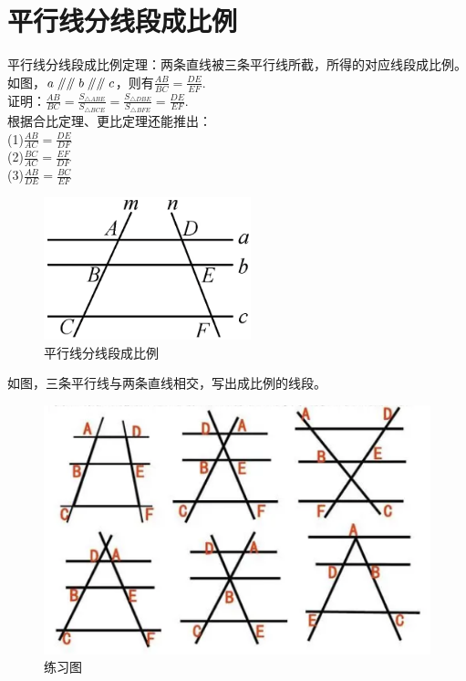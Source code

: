 \documentclass{ecnuthesis}
\newcommand\px{\mathrel{/\mkern-5mu/}}  %
\begin{document}
\section{平行线分线段成比例}
\begin{knowledge}
    平行线分线段成比例定理：两条直线被三条平行线所截，所得的对应线段成比例。\\
    如图，$a\px\px b\px\px c$，则有$\frac{AB}{BC}=\frac{DE}{EF}.$ \\
    证明：$\frac{AB}{BC}=\frac{S_{\triangle ABE}}{S_{\triangle BCE}}=\frac{S_{\triangle DBE}}{S_{\triangle BFE}}=\frac{DE}{EF}.$ \\
    根据合比定理、更比定理还能推出：\\
    (1)$\frac{AB}{AC}=\frac{DE}{DF}$ \\
    (2)$\frac{BC}{AC}=\frac{EF}{DF}$ \\
    (3)$\frac{AB}{DE}=\frac{BC}{EF}$
\end{knowledge}
\begin{figure}[H]
\centering
\includegraphics[width=6cm]{picture/802.png}
\caption{平行线分线段成比例}
\end{figure}
\begin{problem}
    如图，三条平行线与两条直线相交，写出成比例的线段。
\end{problem}
\begin{figure}[H]
\centering
\includegraphics[width=14cm]{picture/803.png}
\caption{练习图}
\end{figure}
\end{document}
